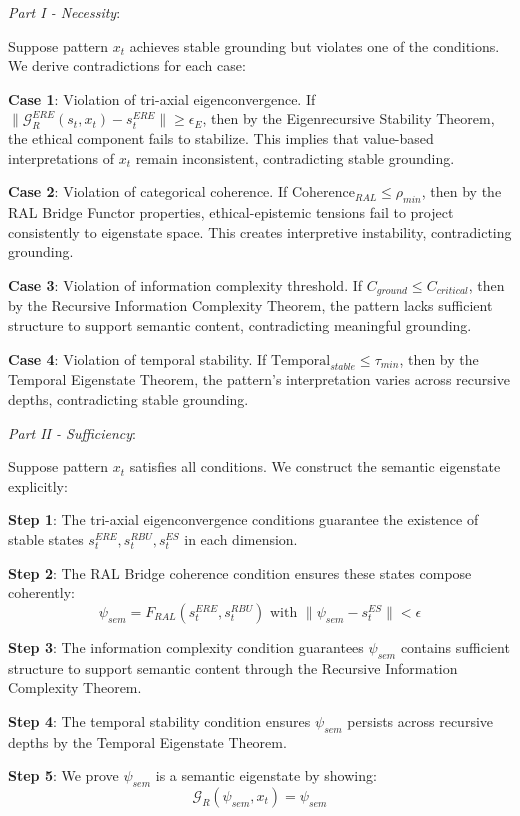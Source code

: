 \documentclass[
]{article}
\begin{document}
\emph{Part I - Necessity}:

Suppose pattern \(x_t\) achieves stable grounding but violates one of
the conditions. We derive contradictions for each case:

\textbf{Case 1}: Violation of tri-axial eigenconvergence. If
\(\|\mathcal{G}_R^{ERE}(s_t, x_t) - s_t^{ERE}\| \geq \epsilon_E\), then
by the Eigenrecursive Stability Theorem, the ethical component fails to
stabilize. This implies that value-based interpretations of \(x_t\)
remain inconsistent, contradicting stable grounding.

\textbf{Case 2}: Violation of categorical coherence. If
\(\text{Coherence}_{RAL} \leq \rho_{min}\), then by the RAL Bridge
Functor properties, ethical-epistemic tensions fail to project
consistently to eigenstate space. This creates interpretive instability,
contradicting grounding.

\textbf{Case 3}: Violation of information complexity threshold. If
\(C_{ground} \leq C_{critical}\), then by the Recursive Information
Complexity Theorem, the pattern lacks sufficient structure to support
semantic content, contradicting meaningful grounding.

\textbf{Case 4}: Violation of temporal stability. If
\(\text{Temporal}_{stable} \leq \tau_{min}\), then by the Temporal
Eigenstate Theorem, the pattern's interpretation varies across recursive
depths, contradicting stable grounding.

\emph{Part II - Sufficiency}:

Suppose pattern \(x_t\) satisfies all conditions. We construct the
semantic eigenstate explicitly:

\textbf{Step 1}: The tri-axial eigenconvergence conditions guarantee the
existence of stable states \(s_t^{ERE}, s_t^{RBU}, s_t^{ES}\) in each
dimension.

\textbf{Step 2}: The RAL Bridge coherence condition ensures these states
compose coherently:
\[\psi_{sem} = F_{RAL}(s_t^{ERE}, s_t^{RBU}) \text{ with } \|\psi_{sem} - s_t^{ES}\| < \epsilon\]

\textbf{Step 3}: The information complexity condition guarantees
\(\psi_{sem}\) contains sufficient structure to support semantic content
through the Recursive Information Complexity Theorem.

\textbf{Step 4}: The temporal stability condition ensures \(\psi_{sem}\)
persists across recursive depths by the Temporal Eigenstate Theorem.

\textbf{Step 5}: We prove \(\psi_{sem}\) is a semantic eigenstate by
showing: \[\mathcal{G}_R(\psi_{sem}, x_t) = \psi_{sem}\]
\end{document}
